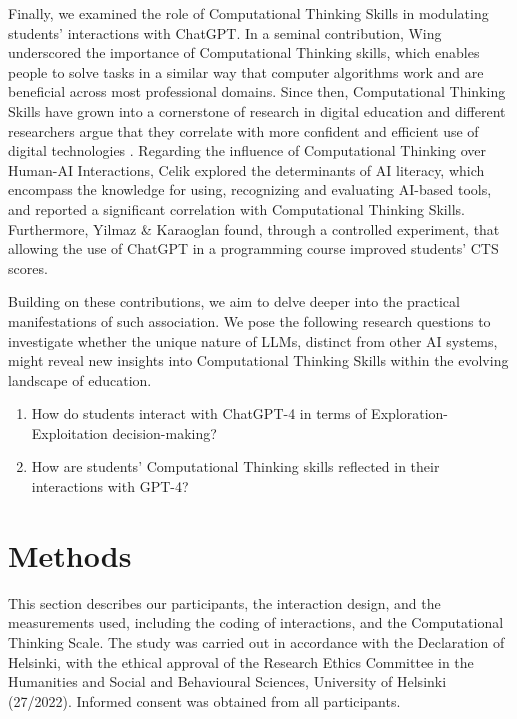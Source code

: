 \documentclass[sn-mathphys, Numbered]{sn-jnl}%
\theoremstyle{thmstyleone}%
\theoremstyle{thmstyletwo}%
\theoremstyle{thmstylethree}%
\begin{document}
Finally, we examined the role of Computational Thinking Skills in modulating students' interactions with ChatGPT. In a seminal contribution, Wing \parencite*{wing_computational_2006} underscored the importance of Computational Thinking skills, which enables people to solve tasks in a similar way that computer algorithms work and are beneficial across most professional domains. Since then, Computational Thinking Skills have grown into a cornerstone of research in digital education and different researchers argue that they correlate with more confident and efficient use of digital technologies \parencite{cansu_overview_2019,grover_computational_2013, shute_demystifying_2017}. Regarding the influence of Computational Thinking over Human-AI Interactions, Celik \parencite*{celik_exploring_2023} explored the determinants of AI literacy, which encompass the knowledge for using, recognizing and evaluating AI-based tools, and reported a significant correlation with Computational Thinking Skills.
Furthermore, Yilmaz \& Karaoglan \parencite*{yilmaz_effect_2023} found, through a controlled experiment, that allowing the use of ChatGPT in a programming course improved students' CTS scores.

Building on these contributions, we aim to delve deeper into the practical manifestations of such association. We pose the following research questions to investigate whether the unique nature of LLMs, distinct from other AI systems, might reveal new insights into Computational Thinking Skills within the evolving landscape of education. 
\begin{enumerate}[itemsep=.5em,leftmargin=.5in,label=\textbf{RQ\arabic*.}]
    \item How do students interact with ChatGPT-4 in terms of Exploration-Exploitation decision-making?
    \item How are students' Computational Thinking skills reflected in their interactions with GPT-4? 
\end{enumerate}



\section{Methods}\label{Methods}

This section describes our participants, the interaction design, and the measurements used, including the coding of interactions, and the Computational Thinking Scale. The study was carried out in accordance with the Declaration of Helsinki, with the ethical approval of the Research Ethics Committee in the Humanities and Social and Behavioural Sciences, University of Helsinki (27/2022). Informed consent was obtained from all participants.
\end{document}
